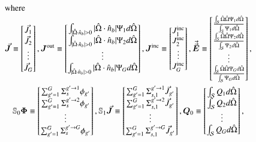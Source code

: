 \begin{gather}
  \shortintertext{where}
  \vec{\bm{J}} \equiv
  \begin{bmatrix}
    \vec{J}_1 \\
    \vec{J}_2 \\
    \vdots \\
    \vec{J}_G
  \end{bmatrix},
  \bm{J}^\text{out} \equiv
  \begin{bmatrix}
    \int_{|\hat{\Omega}\cdot\hat{n}_b|>0}|\hat{\Omega}\cdot\hat{n}_b|\Psi_1 d\hat{\Omega} \\
    \int_{|\hat{\Omega}\cdot\hat{n}_b|>0}|\hat{\Omega}\cdot\hat{n}_b|\Psi_2 d\hat{\Omega} \\
    \vdots \\
    \int_{|\hat{\Omega}\cdot\hat{n}_b|>0}|\hat{\Omega}\cdot\hat{n}_b|\Psi_G d\hat{\Omega}
  \end{bmatrix},
  \bm{J}^\text{inc} \equiv
  \begin{bmatrix}
    J^\text{inc}_1 \\
    J^\text{inc}_2 \\
    \vdots \\
    J^\text{inc}_G
  \end{bmatrix},
  \vec{\vec{\bm{E}}} \equiv
  \begin{bmatrix}
    \frac{\int_\mathcal{S} \hat{\Omega}\hat{\Omega}\Psi_1 d\hat{\Omega}}{\int_\mathcal{S}\Psi_1 d\hat{\Omega}} \\
    \frac{\int_\mathcal{S} \hat{\Omega}\hat{\Omega}\Psi_2 d\hat{\Omega}}{\int_\mathcal{S}\Psi_2 d\hat{\Omega}} \\
    \vdots \\
    \frac{\int_\mathcal{S} \hat{\Omega}\hat{\Omega}\Psi_G d\hat{\Omega}}{\int_\mathcal{S}\Psi_G d\hat{\Omega}}
  \end{bmatrix}, \nonumber \\
  \mathbb{S}_0 \bm{\Phi} \equiv
  \begin{bmatrix}
    \sum^G_{g'=1}\Sigma_s^{g'\rightarrow 1}\phi_{g'} \\
    \sum^G_{g'=1}\Sigma_s^{g'\rightarrow 2}\phi_{g'} \\
    \vdots \\
    \sum^G_{g'=1}\Sigma_s^{g'\rightarrow G}\phi_{g'}
  \end{bmatrix},
  \mathbb{S}_1 \vec{\bm{J}} \equiv
  \begin{bmatrix}
    \sum^G_{g'=1}\Sigma_{s,1}^{g'\rightarrow 1}\vec{J}_{g'} \\
    \sum^G_{g'=1}\Sigma_{s,1}^{g'\rightarrow 2}\vec{J}_{g'} \\
    \vdots \\
    \sum^G_{g'=1}\Sigma_{s,1}^{g'\rightarrow G}\vec{J}_{g'}
  \end{bmatrix},
  \bm{Q}_0 \equiv
  \begin{bmatrix}
    \int_\mathcal{S} Q_1 d\hat{\Omega} \\
    \int_\mathcal{S} Q_2 d\hat{\Omega} \\
    \vdots \\
    \int_\mathcal{S} Q_G d\hat{\Omega}
  \end{bmatrix}, \nonumber
\end{gather}
